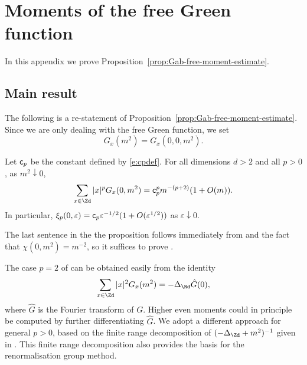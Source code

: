 \chapter{Moments of the free Green function}
\label{app:free-moments}

In this appendix we prove Proposition~\ref{prop:Gab-free-moment-estimate}.


\section{Main result}

The following is a re-statement of Proposition~\ref{prop:Gab-free-moment-estimate}.
Since we are only dealing with the free Green function, we set
\begin{equation}
G_x(m^2) = G_x(0, 0, m^2).
\end{equation}

\begin{prop}\label{prop:Gab-free-moment-estimate-bis}
Let ${\sf c}_p$ be the constant defined by \eqref{e:cpdef}.
For all dimensions $d>2$ and all $p>0$,
as $m^2 \downarrow 0$,
\begin{equation}
\label{e:Gab-free-moment-estimate-bis}
\sum_{x\in\Zd} |x|^p G_{x}(0, m^2)
=
{\sf c}_p^p m^{-(p + 2)} (1 + O(m)).
\end{equation}
In particular, $\xi_p(0,\varepsilon) = {\sf c}_p \varepsilon^{-1/2}
(1+O(\varepsilon^{1/2}))$ as $\varepsilon \downarrow 0$.
\end{prop}

The last sentence in the the proposition follows immediately from
 and the fact that $\chi(0,m^2)=m^{-2}$,
so it suffices to prove .

The case $p = 2$ of 
can be obtained easily from the identity
\begin{equation}
\sum_{x\in\Zd} |x|^2 G_x(m^2) = -\Delta_\Rd \hat{G}(0),
\end{equation}
where $\hat G$ is the Fourier transform of $G$.
Higher even moments could in principle
be computed by further differentiating $\hat G$.
We adopt a different approach
for general $p>0$,
based on the finite range decomposition of $(-\Delta_{\Zd}+m^2)^{-1}$
given in \cite{BGM04,Baue13a}.
This finite range decomposition also provides the basis for the renormalisation group method.

